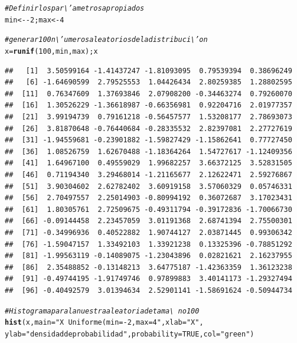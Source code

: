\documentclass[12pt,letterpaper]{article}\usepackage[]{graphicx}\usepackage[]{color}
\makeatletter
\newcommand{\hlnum}[1]{\textcolor[rgb]{0.686,0.059,0.569}{#1}}%
\newcommand{\hlstr}[1]{\textcolor[rgb]{0.192,0.494,0.8}{#1}}%
\newcommand{\hlcom}[1]{\textcolor[rgb]{0.678,0.584,0.686}{\textit{#1}}}%
\newcommand{\hlopt}[1]{\textcolor[rgb]{0,0,0}{#1}}%
\newcommand{\hlstd}[1]{\textcolor[rgb]{0.345,0.345,0.345}{#1}}%
\newcommand{\hlkwb}[1]{\textcolor[rgb]{0.69,0.353,0.396}{#1}}%
\newcommand{\hlkwc}[1]{\textcolor[rgb]{0.333,0.667,0.333}{#1}}%
\newcommand{\hlkwd}[1]{\textcolor[rgb]{0.737,0.353,0.396}{\textbf{#1}}}%
\newenvironment{kframe}{%
 \def\at@end@of@kframe{}%
 \ifinner\ifhmode%
  \def\at@end@of@kframe{\end{minipage}}%
  \begin{minipage}{\columnwidth}%
 \fi\fi%
 \def\FrameCommand##1{\hskip\@totalleftmargin \hskip-\fboxsep
 \colorbox{shadecolor}{##1}\hskip-\fboxsep
     \hskip-\linewidth \hskip-\@totalleftmargin \hskip\columnwidth}%
 \MakeFramed {\advance\hsize-\width
   \@totalleftmargin\z@ \linewidth\hsize
   \@setminipage}}%
 {\par\unskip\endMakeFramed%
 \at@end@of@kframe}
\newenvironment{knitrout}{}{} %
\makeatother
\begin{document}
\begin{knitrout}
\color{fgcolor}\begin{kframe}
\begin{alltt}
\hlcom{# Definir los par\textbackslash{}'ametros apropiados}
\hlstd{min} \hlkwb{<-} \hlopt{-}\hlnum{2}\hlstd{; max} \hlkwb{<-} \hlnum{4}

\hlcom{# generar 100 n\textbackslash{}'umeros aleatorios de la distribuci\textbackslash{}'on }
\hlstd{x} \hlkwb{=} \hlkwd{runif}\hlstd{(}\hlnum{100}\hlstd{, min, max); x}
\end{alltt}
\begin{verbatim}
##   [1]  3.50599164 -1.41437247 -1.81093095  0.79539394  0.38696249
##   [6] -1.64690599  2.79525553  1.04426434  2.80259385  1.28802595
##  [11]  0.76347609  1.37693846  2.07908200 -0.34463274  0.79260070
##  [16]  1.30526229 -1.36618987 -0.66356981  0.92204716  2.01977357
##  [21]  3.99194739  0.79161218 -0.56457577  1.53208177  2.78693073
##  [26]  3.81870648 -0.76440684 -0.28335532  2.82397081  2.27727619
##  [31] -1.94559681 -0.23901882 -1.59827429 -1.15862641  0.77727450
##  [36]  1.08526759  1.62670488 -1.18364264  1.54727617 -1.12409356
##  [41]  1.64967100  0.49559029  1.99682257  3.66372125  3.52831505
##  [46]  0.71194340  3.29468014 -1.21165677  2.12622471  2.59276867
##  [51]  3.90304602  2.62782402  3.60919158  3.57060329  0.05746331
##  [56]  2.70497557  2.25014903 -0.80994192  0.36072687  3.17023431
##  [61]  1.80305761  2.72509675 -0.49311794 -0.39172836 -1.70066730
##  [66] -0.09144458  2.23457059  3.01191368  2.68741394  2.75500301
##  [71] -0.34996936  0.40522882  1.90744127  2.03871445  0.99306342
##  [76] -1.59047157  1.33492103  1.33921238  0.13325396 -0.78851292
##  [81] -1.99563119 -0.14089075 -1.23043896  0.02821621  2.16237955
##  [86]  2.35488852 -0.13148213  3.64775187 -1.42363359  1.36123238
##  [91] -0.49744195 -1.91749746  0.97899883  3.40141173 -1.29327494
##  [96] -0.40492579  3.01394634  2.52901141 -1.58691624 -0.50944734
\end{verbatim}
\begin{alltt}
\hlcom{# Histograma para la nuestra aleatoria de tama\textbackslash{}~no 100 }
\hlkwd{hist}\hlstd{(x,} \hlkwc{main}\hlstd{=}\hlstr{"X ~ Uniforme(min=-2, max=4"}\hlstd{,} \hlkwc{xlab}\hlstd{=}\hlstr{"X"}\hlstd{,}
     \hlkwc{ylab}\hlstd{=}\hlstr{"densidad de probabilidad"}\hlstd{,} \hlkwc{probability}\hlstd{=}\hlnum{TRUE}\hlstd{,} \hlkwc{col}\hlstd{=}\hlstr{"green"}\hlstd{)}


\end{alltt}
\end{kframe}
\end{knitrout}
\end{document}
